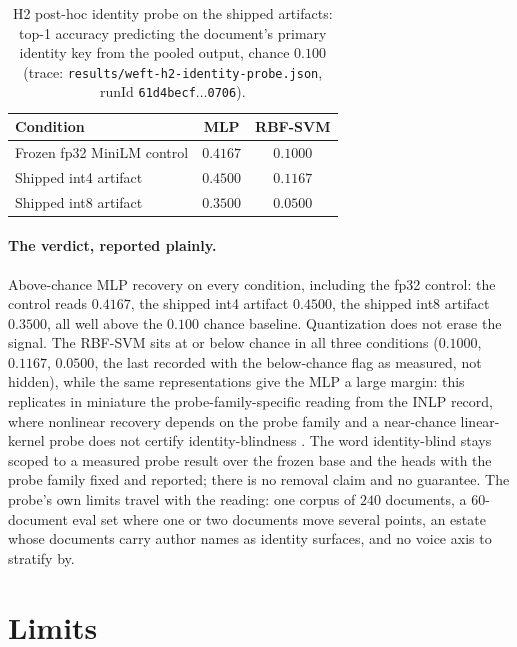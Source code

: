 \documentclass{article}
\begin{document}
\begin{table}[t]
\caption{H2 post-hoc identity probe on the shipped artifacts: top-1 accuracy predicting the document's primary identity key from the pooled output, chance $0.100$ (trace: \texttt{results/weft-h2-identity-probe.json}, runId \texttt{61d4becf$\ldots$0706}).}
\label{tab:h2}
\vskip 0.08in
\begin{center}
\begin{tabular}{lcc}
\toprule
\textbf{Condition} & \textbf{MLP} & \textbf{RBF-SVM} \\
\midrule
Frozen fp32 MiniLM control & $0.4167$ & $0.1000$ \\
Shipped int4 artifact & $0.4500$ & $0.1167$ \\
Shipped int8 artifact & $0.3500$ & $0.0500$ \\
\bottomrule
\end{tabular}
\end{center}
\vskip -0.14in
\end{table}

\paragraph{The verdict, reported plainly.}
Above-chance MLP recovery on every condition, including the fp32 control: the control reads $0.4167$, the shipped int4 artifact $0.4500$, the shipped int8 artifact $0.3500$, all well above the $0.100$ chance baseline. Quantization does not erase the signal. The RBF-SVM sits at or below chance in all three conditions ($0.1000$, $0.1167$, $0.0500$, the last recorded with the below-chance flag as measured, not hidden), while the same representations give the MLP a large margin: this replicates in miniature the probe-family-specific reading from the INLP record, where nonlinear recovery depends on the probe family and a near-chance linear-kernel probe does not certify identity-blindness \citep{ravfogel2020null}. The word identity-blind stays scoped to a measured probe result over the frozen base and the heads with the probe family fixed and reported; there is no removal claim and no guarantee. The probe's own limits travel with the reading: one corpus of $240$ documents, a $60$-document eval set where one or two documents move several points, an estate whose documents carry author names as identity surfaces, and no voice axis to stratify by.

\section{Limits}
\label{sec:limits}
\end{document}
